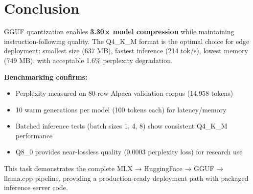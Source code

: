 \documentclass[11pt,a4paper]{article}
\begin{document}
\section*{Conclusion}
GGUF quantization enables \textbf{3.30× model compression} while maintaining instruction-following quality. The Q4\_K\_M format is the optimal choice for edge deployment: smallest size (637 MB), fastest inference (214 tok/s), lowest memory (749 MB), with acceptable 1.6\% perplexity degradation.

\textbf{Benchmarking confirms:}
\begin{itemize}
    \item Perplexity measured on 80-row Alpaca validation corpus (14,958 tokens)
    \item 10 warm generations per model (100 tokens each) for latency/memory
    \item Batched inference tests (batch sizes 1, 4, 8) show consistent Q4\_K\_M performance
    \item Q8\_0 provides near-lossless quality (0.0003 perplexity loss) for research use
\end{itemize}

This task demonstrates the complete MLX → HuggingFace → GGUF → llama.cpp pipeline, providing a production-ready deployment path with packaged inference server code.
\end{document}
